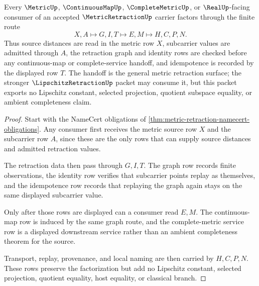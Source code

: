 \begin{theorem}
\label{thm:metric-retraction-idempotent-handoff}
Every $\MetricUp$, $\ContinuousMapUp$, $\CompleteMetricUp$, or $\RealUp$-facing consumer of an accepted $\MetricRetractionUp$ carrier factors through the finite route
$$
X,A \longmapsto G,I,T \longmapsto E,M \longmapsto H,C,P,N .
$$
Thus source distances are read in the metric row $X$, subcarrier values are admitted through $A$, the retraction graph and identity rows are checked before any continuous-map or complete-service handoff, and idempotence is recorded by the displayed row $T$. The handoff is the general metric retraction surface; the stronger $\LipschitzRetractionUp$ packet may consume it, but this packet exports no Lipschitz constant, selected projection, quotient subspace equality, or ambient completeness claim.
\end{theorem}
\begin{proof}
Start with the NameCert obligations of \autoref{thm:metric-retraction-namecert-obligations}. Any consumer first receives the metric source row $X$ and the subcarrier row $A$, since these are the only rows that can supply source distances and admitted retraction values.

The retraction data then pass through $G,I,T$. The graph row records finite observations, the identity row verifies that subcarrier points replay as themselves, and the idempotence row records that replaying the graph again stays on the same displayed subcarrier value.

Only after those rows are displayed can a consumer read $E,M$. The continuous-map row is induced by the same graph route, and the complete-metric service row is a displayed downstream service rather than an ambient completeness theorem for the source.

Transport, replay, provenance, and local naming are then carried by $H,C,P,N$. These rows preserve the factorization but add no Lipschitz constant, selected projection, quotient equality, host equality, or classical branch.
\end{proof}


